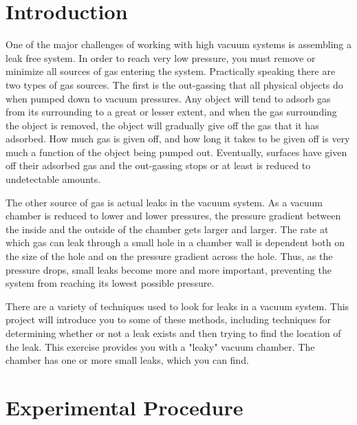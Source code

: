\section{Introduction}

One of the major challenges of working with high vacuum systems is assembling a leak free system. In order to reach very low pressure, you must remove or minimize all sources of gas entering the system. Practically speaking there are two types of gas sources. The first is the out-gassing that all physical objects do when pumped down to vacuum pressures. Any object will tend to adsorb gas from its surrounding to a great or lesser extent, and when the gas surrounding the object is removed, the object will gradually give off the gas that it has adsorbed. How much gas is given off, and how long it takes to be given off is very much a function of the object being pumped out. Eventually, surfaces have given off their adsorbed gas and the out-gassing stops or at least is reduced to undetectable amounts.

The other source of gas is actual leaks in the vacuum system. As a vacuum chamber is reduced to lower and lower pressures, the pressure gradient between the inside and the outside of the chamber gets larger and larger. The rate at which gas can leak through a small hole in a chamber wall is dependent both on the size of the hole and on the pressure gradient across the hole. Thus, as the pressure drops, small leaks become more and more important, preventing the system from reaching its lowest possible pressure.

There are a variety of techniques used to look for leaks in a vacuum system. This project will introduce you to some of these methods, including techniques for determining whether or not a leak exists and then trying to find the location of the leak. This exercise provides you with a "leaky" vacuum chamber. The chamber has one or more small leaks, which you can find.

\section{Experimental Procedure}

